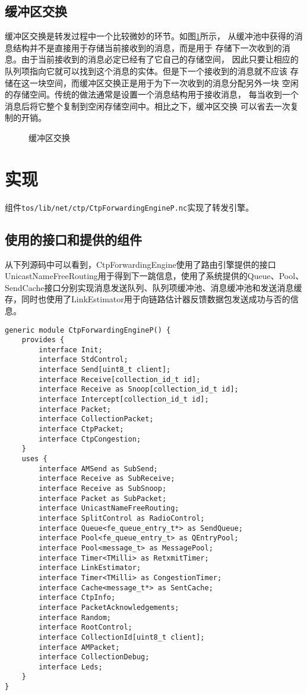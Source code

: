 \subsection{缓冲区交换}\label{bufswap}
缓冲区交换是转发过程中一个比较微妙的环节。如图\ref{buffer-swap}所示，
从缓冲池中获得的消息结构并不是直接用于存储当前接收到的消息，而是用于
存储下一次收到的消息。由于当前接收到的消息必定已经有了它自己的存储空间，
因此只要让相应的队列项指向它就可以找到这个消息的实体。但是下一个接收到的消息就不应该
存储在这一块空间，而缓冲区交换正是用于为下一次收到的消息分配另外一块
空闲的存储空间。传统的做法通常是设置一个消息结构用于接收消息，
每当收到一个消息后将它整个复制到空闲存储空间中。相比之下，缓冲区交换
可以省去一次复制的开销。

\begin{figure}[ht]
\centering

\caption{缓冲区交换}\label{buffer-swap}
\end{figure}

\section{实现}
组件\texttt{tos/lib/net/ctp/CtpForwardingEngineP.nc}实现了转发引擎。

\subsection{使用的接口和提供的组件}
从下列源码中可以看到，CtpForwardingEngine使用了路由引擎提供的接口UnicastNameFreeRouting用于得到下一跳信息，使用了系统提供的Queue、Pool、SendCache接口分别实现消息发送队列、队列项缓冲池、消息缓冲池和发送消息缓存，同时也使用了LinkEstimator用于向链路估计器反馈数据包发送成功与否的信息。

\begin{lstlisting}
generic module CtpForwardingEngineP() {
	provides {
		interface Init;
		interface StdControl;
		interface Send[uint8_t client];
		interface Receive[collection_id_t id];
		interface Receive as Snoop[collection_id_t id];
		interface Intercept[collection_id_t id];
		interface Packet;
		interface CollectionPacket;
		interface CtpPacket;
		interface CtpCongestion;
	}
	uses {
		interface AMSend as SubSend;
		interface Receive as SubReceive;
		interface Receive as SubSnoop;
		interface Packet as SubPacket;
		interface UnicastNameFreeRouting;
		interface SplitControl as RadioControl;
		interface Queue<fe_queue_entry_t*> as SendQueue;
		interface Pool<fe_queue_entry_t> as QEntryPool;
		interface Pool<message_t> as MessagePool;
		interface Timer<TMilli> as RetxmitTimer;
		interface LinkEstimator;
		interface Timer<TMilli> as CongestionTimer;
		interface Cache<message_t*> as SentCache;
		interface CtpInfo;
		interface PacketAcknowledgements;
		interface Random;
		interface RootControl;
		interface CollectionId[uint8_t client];
		interface AMPacket;
		interface CollectionDebug;
		interface Leds;
	}
}
\end{lstlisting}

